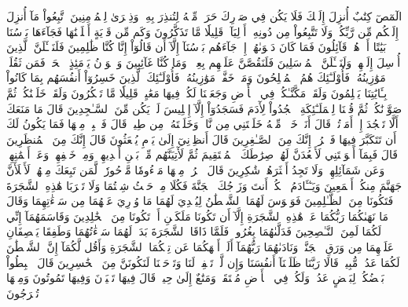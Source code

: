 الٓمٓصٓ
كِتَٰبٌ أُنزِلَ إِلَيۡكَ فَلَا يَكُن فِي صَدۡرِكَ حَرَجٞ مِّنۡهُ لِتُنذِرَ بِهِۦ وَذِكۡرَىٰ لِلۡمُؤۡمِنِينَ
ٱتَّبِعُواْ مَآ أُنزِلَ إِلَيۡكُم مِّن رَّبِّكُمۡ وَلَا تَتَّبِعُواْ مِن دُونِهِۦٓ أَوۡلِيَآءَۗ قَلِيلٗا مَّا تَذَكَّرُونَ
وَكَم مِّن قَرۡيَةٍ أَهۡلَكۡنَٰهَا فَجَآءَهَا بَأۡسُنَا بَيَٰتًا أَوۡ هُمۡ قَآئِلُونَ
فَمَا كَانَ دَعۡوَىٰهُمۡ إِذۡ جَآءَهُم بَأۡسُنَآ إِلَّآ أَن قَالُوٓاْ إِنَّا كُنَّا ظَٰلِمِينَ
فَلَنَسۡـَٔلَنَّ ٱلَّذِينَ أُرۡسِلَ إِلَيۡهِمۡ وَلَنَسۡـَٔلَنَّ ٱلۡمُرۡسَلِينَ
فَلَنَقُصَّنَّ عَلَيۡهِم بِعِلۡمٖۖ وَمَا كُنَّا غَآئِبِينَ
وَٱلۡوَزۡنُ يَوۡمَئِذٍ ٱلۡحَقُّۚ فَمَن ثَقُلَتۡ مَوَٰزِينُهُۥ فَأُوْلَـٰٓئِكَ هُمُ ٱلۡمُفۡلِحُونَ
وَمَنۡ خَفَّتۡ مَوَٰزِينُهُۥ فَأُوْلَـٰٓئِكَ ٱلَّذِينَ خَسِرُوٓاْ أَنفُسَهُم بِمَا كَانُواْ بِـَٔايَٰتِنَا يَظۡلِمُونَ
وَلَقَدۡ مَكَّنَّـٰكُمۡ فِي ٱلۡأَرۡضِ وَجَعَلۡنَا لَكُمۡ فِيهَا مَعَٰيِشَۗ قَلِيلٗا مَّا تَشۡكُرُونَ
وَلَقَدۡ خَلَقۡنَٰكُمۡ ثُمَّ صَوَّرۡنَٰكُمۡ ثُمَّ قُلۡنَا لِلۡمَلَـٰٓئِكَةِ ٱسۡجُدُواْ لِأٓدَمَ فَسَجَدُوٓاْ إِلَّآ إِبۡلِيسَ لَمۡ يَكُن مِّنَ ٱلسَّـٰجِدِينَ
قَالَ مَا مَنَعَكَ أَلَّا تَسۡجُدَ إِذۡ أَمَرۡتُكَۖ قَالَ أَنَا۠ خَيۡرٞ مِّنۡهُ خَلَقۡتَنِي مِن نَّارٖ وَخَلَقۡتَهُۥ مِن طِينٖ
قَالَ فَٱهۡبِطۡ مِنۡهَا فَمَا يَكُونُ لَكَ أَن تَتَكَبَّرَ فِيهَا فَٱخۡرُجۡ إِنَّكَ مِنَ ٱلصَّـٰغِرِينَ
قَالَ أَنظِرۡنِيٓ إِلَىٰ يَوۡمِ يُبۡعَثُونَ
قَالَ إِنَّكَ مِنَ ٱلۡمُنظَرِينَ
قَالَ فَبِمَآ أَغۡوَيۡتَنِي لَأَقۡعُدَنَّ لَهُمۡ صِرَٰطَكَ ٱلۡمُسۡتَقِيمَ
ثُمَّ لَأٓتِيَنَّهُم مِّنۢ بَيۡنِ أَيۡدِيهِمۡ وَمِنۡ خَلۡفِهِمۡ وَعَنۡ أَيۡمَٰنِهِمۡ وَعَن شَمَآئِلِهِمۡۖ وَلَا تَجِدُ أَكۡثَرَهُمۡ شَٰكِرِينَ
قَالَ ٱخۡرُجۡ مِنۡهَا مَذۡءُومٗا مَّدۡحُورٗاۖ لَّمَن تَبِعَكَ مِنۡهُمۡ لَأَمۡلَأَنَّ جَهَنَّمَ مِنكُمۡ أَجۡمَعِينَ
وَيَـٰٓـَٔادَمُ ٱسۡكُنۡ أَنتَ وَزَوۡجُكَ ٱلۡجَنَّةَ فَكُلَا مِنۡ حَيۡثُ شِئۡتُمَا وَلَا تَقۡرَبَا هَٰذِهِ ٱلشَّجَرَةَ فَتَكُونَا مِنَ ٱلظَّـٰلِمِينَ
فَوَسۡوَسَ لَهُمَا ٱلشَّيۡطَٰنُ لِيُبۡدِيَ لَهُمَا مَا وُۥرِيَ عَنۡهُمَا مِن سَوۡءَٰتِهِمَا وَقَالَ مَا نَهَىٰكُمَا رَبُّكُمَا عَنۡ هَٰذِهِ ٱلشَّجَرَةِ إِلَّآ أَن تَكُونَا مَلَكَيۡنِ أَوۡ تَكُونَا مِنَ ٱلۡخَٰلِدِينَ
وَقَاسَمَهُمَآ إِنِّي لَكُمَا لَمِنَ ٱلنَّـٰصِحِينَ
فَدَلَّىٰهُمَا بِغُرُورٖۚ فَلَمَّا ذَاقَا ٱلشَّجَرَةَ بَدَتۡ لَهُمَا سَوۡءَٰتُهُمَا وَطَفِقَا يَخۡصِفَانِ عَلَيۡهِمَا مِن وَرَقِ ٱلۡجَنَّةِۖ وَنَادَىٰهُمَا رَبُّهُمَآ أَلَمۡ أَنۡهَكُمَا عَن تِلۡكُمَا ٱلشَّجَرَةِ وَأَقُل لَّكُمَآ إِنَّ ٱلشَّيۡطَٰنَ لَكُمَا عَدُوّٞ مُّبِينٞ
قَالَا رَبَّنَا ظَلَمۡنَآ أَنفُسَنَا وَإِن لَّمۡ تَغۡفِرۡ لَنَا وَتَرۡحَمۡنَا لَنَكُونَنَّ مِنَ ٱلۡخَٰسِرِينَ
قَالَ ٱهۡبِطُواْ بَعۡضُكُمۡ لِبَعۡضٍ عَدُوّٞۖ وَلَكُمۡ فِي ٱلۡأَرۡضِ مُسۡتَقَرّٞ وَمَتَٰعٌ إِلَىٰ حِينٖ
قَالَ فِيهَا تَحۡيَوۡنَ وَفِيهَا تَمُوتُونَ وَمِنۡهَا تُخۡرَجُونَ
